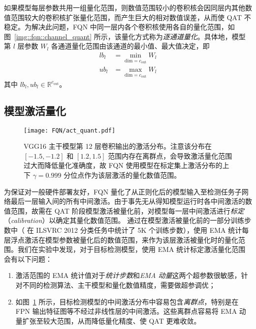 如果模型每层参数共用一组量化范围，则数值范围较小的卷积核会因同层内其他数值范围较大的卷积核扩张量化范围，而产生巨大的相对数值误差，从而使 QAT 不稳定。为解决此问题，FQN 中同一层内各个卷积核使用各自的量化范围，如图~\ref{img::fqn::channel_quant} 所示，该量化方式称为\emph{逐通道量化}。具体地，模型第 $l$ 层参数 $W_l$ 各通道量化范围由该通道的最小值、最大值决定，即
\begin{align}
  lb_l &= \min_{\mathrm{dim}=c_{\mathrm{out}}} W_l \\
  ub_l &= \max_{\mathrm{dim}=c_{\mathrm{out}}} W_l
\end{align}
其中 $lb_l, ub_l \in \mathbb{R}^{c_{\mathrm{out}}}$。
\subsection{模型激活量化} \label{sec::fqn::q_act}

\begin{figure}[htb]
  \centering
  \texttt{[image: FQN/act\_quant.pdf]}
  \caption{VGG16 主干模型第 12 层卷积输出的激活分布。注意该分布在 $[-1.5, -1.2]$ 和 $[1.2, 1.5]$ 范围内存在离群点，会导致激活量化范围过大而降低量化准确度，故 FQN 使用模型在标定集上激活分布的上下 $\gamma = 0.999$ 分位点作为该层激活的量化数值范围。}
  \label{img::fqn::q_act}
\end{figure}

为保证对一般硬件部署友好，FQN 量化了从正则化后的模型输入至检测任务子网络最后一层输入间的所有中间激活。由于事先无从得知模型运行时各中间激活的数值范围，故需在 QAT 阶段模型激活被量化前，对模型每一层中间激活进行\emph{标定}（\emph{calibration}）以确定其量化数值范围。\citet{jacob2018quantization, krishnamoorthi2018quantizing} 通过在模型激活被量化前的一部分训练步数中（\citet{jacob2018quantization} 在 ILSVRC 2012 分类任务中统计了 5K 个训练步数），使用 EMA 统计每层浮点激活在模型参数被量化后的数值范围，来作为该层激活被量化时的量化范围。我们在实验中发现，对于目标检测模型，使用 EMA 统计标定激活量化范围会有以下问题：
\begin{enumerate}[1)]
  \item 激活范围的 EMA 统计值对于\emph{统计步数}和\emph{EMA 动量}这两个超参数很敏感，针对不同的检测算法、主干模型和量化数值精度，需要做超参调优；
  \item 如图~\ref{img::fqn::q_act} 所示，目标检测模型的中间激活分布中容易包含\emph{离群点}，特别是在 FPN 输出特征图等不经过非线性层的中间激活。这些离群点容易将 EMA 动量扩张至较大范围，从而降低量化精度、使 QAT 更难收敛。
\end{enumerate}

